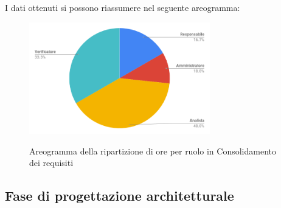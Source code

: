 \pagebreak
I dati ottenuti si possono riassumere nel seguente areogramma:
\begin{figure}[H] 
			\centering 
				\includegraphics[width=0.7\textwidth]{res/images/areogramma_consolidamento.png}\\
				\caption{Areogramma della ripartizione di ore per ruolo in Consolidamento dei requisiti}
			\label{AreogrammaConsolidaemnto}
\end{figure}

\subsection{Fase di progettazione architetturale}
